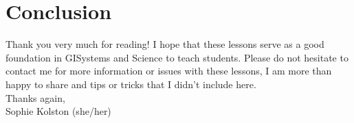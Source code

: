\documentclass{article}
\begin{document}
\vspace{3cm}
\section{Conclusion}
Thank you very much for reading! I hope that these lessons serve as a good foundation in GISystems and Science to teach students. Please do not hesitate to contact me for more information or issues with these lessons, I am more than happy to share and tips or tricks that I didn't include here. \\

Thanks again, \\
Sophie Kolston (she/her)
\end{document}
